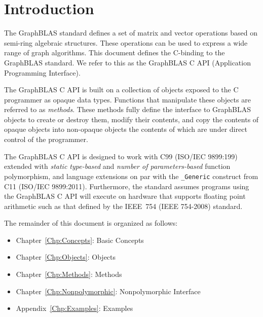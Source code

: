 \documentclass[11pt]{extbook}
\begin{document}

\chapter{Introduction}

The GraphBLAS standard defines a set of matrix and vector operations 
%
based on semi-ring algebraic structures.  
These operations can be used
to express a wide range of graph algorithms.   This document 
defines the C-binding to the GraphBLAS standard.   We refer to 
this as the GraphBLAS C API (Application Programming Interface).   

The GraphBLAS C API is built on a collection of   
objects exposed to the C programmer as opaque data types. 
Functions that manipulate these
objects are referred to as {\it methods}.  These methods fully define the 
interface to GraphBLAS objects to create or destroy them, modify their 
contents, and copy the contents of opaque objects into non-opaque objects the 
contents of which are under direct control of the programmer.

The GraphBLAS C API is designed to work with C99 (ISO/IEC 9899:199) 
extended with {\it static type-based} and {\it number of parameters-based}
function polymorphism, and language extensions on par with 
the {\tt \_Generic} construct from C11 (ISO/IEC 9899:2011).  
Furthermore, the standard assumes programs using the GraphBLAS C API
will execute on hardware that supports floating point arithmetic
such as that defined by the IEEE~754 (IEEE 754-2008) standard. 

The remainder of this document is organized as follows:
\begin{itemize}
\item Chapter~\ref{Chp:Concepts}: Basic Concepts
\item Chapter~\ref{Chp:Objects}: Objects
\item Chapter~\ref{Chp:Methods}: Methods
\item Chapter~\ref{Chp:Nonpolymorphic}: Nonpolymorphic Interface
\item Appendix~\ref{Chp:Examples}: Examples
\end{itemize}
\end{document}
